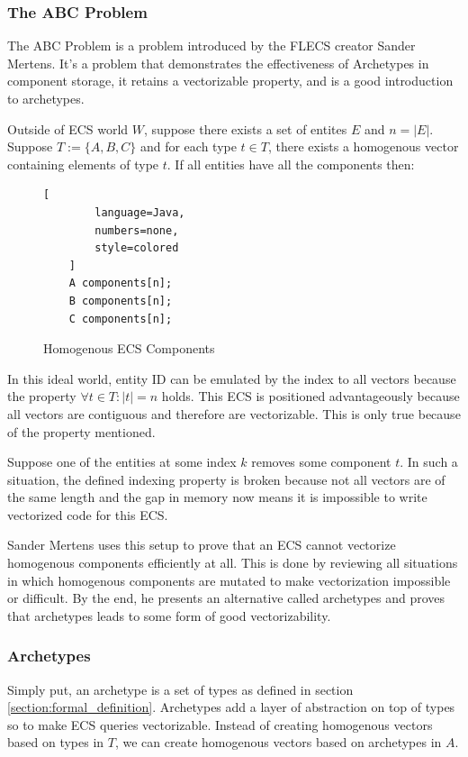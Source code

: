 \subsubsection{The ABC Problem}
The ABC Problem is a problem introduced by the FLECS creator Sander Mertens. It's a problem that demonstrates the effectiveness of Archetypes in component storage, it retains a vectorizable property, and is a good introduction to archetypes. 

Outside of ECS world $W$, suppose there exists a set of entites $E$ and $n = |E|$. Suppose $T := \{A,B,C\}$ and for each type $t \in T$, there exists a homogenous vector containing elements of type $t$. If all entities have all the components then:

\begin{figure}[H]
    \begin{lstlisting}[
        language=Java,
        numbers=none,
        style=colored
    ]
    A components[n];
    B components[n];
    C components[n];
    \end{lstlisting}
    \caption{Homogenous ECS Components}
    \label{code:homogenous_ecs}
\end{figure}

In this ideal world, entity ID can be emulated by the index to all vectors because the property $\forall t \in T : |t| = n$ holds. This ECS is positioned advantageously because all vectors are contiguous and therefore are vectorizable. This is only true because of the property mentioned.

Suppose one of the entities at some index $k$ removes some component $t$. In such a situation, the defined indexing property is broken because not all vectors are of the same length and the gap in memory now means it is impossible to write vectorized code for this ECS.

Sander Mertens uses this setup to prove that an ECS cannot vectorize homogenous components efficiently at all. This is done by reviewing all situations in which homogenous components are mutated to make vectorization impossible or difficult. By the end, he presents an alternative called archetypes and proves that archetypes leads to some form of good vectorizability.

\subsubsection{Archetypes}
Simply put, an archetype is a set of types as defined in section \ref{section:formal_definition}. Archetypes add a layer of abstraction on top of types so to make ECS queries vectorizable. Instead of creating homogenous vectors based on types in $T$, we can create homogenous vectors based on archetypes in $A$. 

